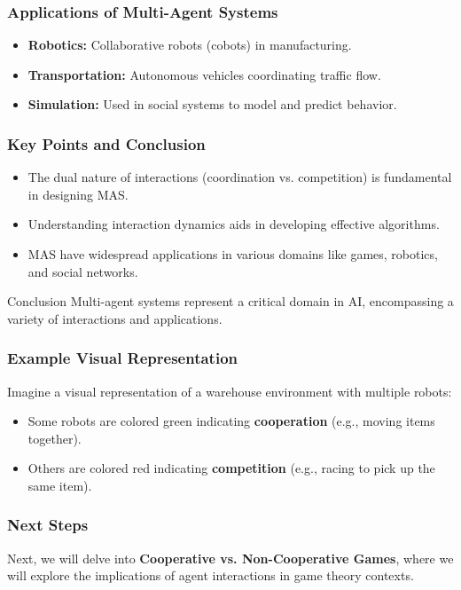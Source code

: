 \documentclass[aspectratio=169]{beamer}
\begin{document}
\begin{frame}[fragile]
    \frametitle{Applications of Multi-Agent Systems}
    \begin{itemize}
        \item \textbf{Robotics:} Collaborative robots (cobots) in manufacturing.
        \item \textbf{Transportation:} Autonomous vehicles coordinating traffic flow.
        \item \textbf{Simulation:} Used in social systems to model and predict behavior.
    \end{itemize}
\end{frame}

\begin{frame}[fragile]
    \frametitle{Key Points and Conclusion}
    \begin{itemize}
        \item The dual nature of interactions (coordination vs. competition) is fundamental in designing MAS.
        \item Understanding interaction dynamics aids in developing effective algorithms.
        \item MAS have widespread applications in various domains like games, robotics, and social networks.
    \end{itemize}
    \begin{block}{Conclusion}
        Multi-agent systems represent a critical domain in AI, encompassing a variety of interactions and applications.
    \end{block}
\end{frame}

\begin{frame}[fragile]
    \frametitle{Example Visual Representation}
    Imagine a visual representation of a warehouse environment with multiple robots:
    \begin{itemize}
        \item Some robots are colored green indicating \textbf{cooperation} (e.g., moving items together).
        \item Others are colored red indicating \textbf{competition} (e.g., racing to pick up the same item).
    \end{itemize}
\end{frame}

\begin{frame}[fragile]
    \frametitle{Next Steps}
    Next, we will delve into \textbf{Cooperative vs. Non-Cooperative Games}, where we will explore the implications of agent interactions in game theory contexts.
\end{frame}
\end{document}
